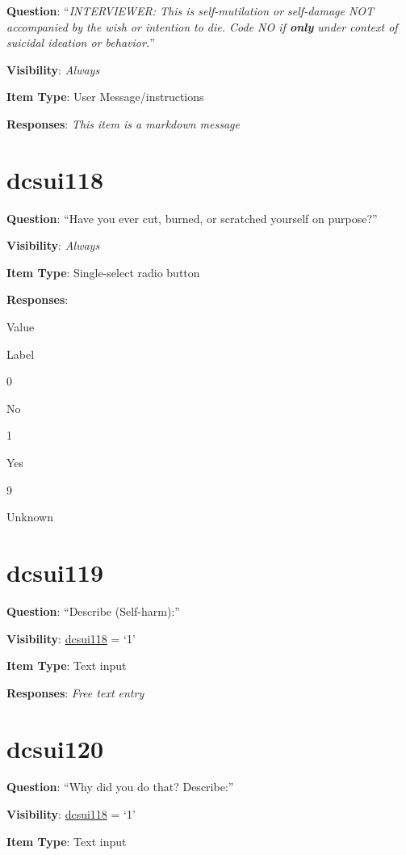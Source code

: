 \documentclass[]{book}
\begin{document}
\textbf{Question}: ``\emph{INTERVIEWER: This is self-mutilation or self-damage NOT accompanied by the wish or intention to die. Code NO if \textbf{only} under context of suicidal ideation or behavior.}''

\textbf{Visibility}: \emph{Always}

\textbf{Item Type}: User Message/instructions

\textbf{Responses}: \emph{This item is a markdown message}

\hypertarget{dcsui118}{%
\section{dcsui118}\label{dcsui118}}

\textbf{Question}: ``Have you ever cut, burned, or scratched yourself on purpose?''

\textbf{Visibility}: \emph{Always}

\textbf{Item Type}: Single-select radio button

\textbf{Responses}:

Value

Label

0

No

1

Yes

9

Unknown

\hypertarget{dcsui119}{%
\section{dcsui119}\label{dcsui119}}

\textbf{Question}: ``Describe (Self-harm):''

\textbf{Visibility}: \protect\hyperlink{dcsui118}{dcsui118} = `1'

\textbf{Item Type}: Text input

\textbf{Responses}: \emph{Free text entry}

\hypertarget{dcsui120}{%
\section{dcsui120}\label{dcsui120}}

\textbf{Question}: ``Why did you do that? Describe:''

\textbf{Visibility}: \protect\hyperlink{dcsui118}{dcsui118} = `1'

\textbf{Item Type}: Text input
\end{document}
